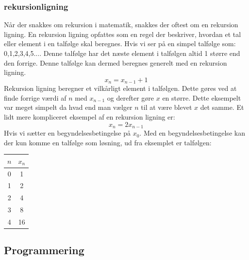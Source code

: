 \documentclass[12pt]{article}
\begin{document}
\subsubsection{rekursionligning}
Når der snakkes om rekursion i matematik, snakkes der oftest om en rekursion ligning. 
En rekursion ligning opfattes som en regel der beskriver, hvordan et tal eller element i en talfølge skal beregnes. Hvis vi ser på en simpel talfølge som: {0,1,2,3,4,5...}. Denne talfølge har det næste element i talfølgen altid 1 større end den forrige. Denne talfølge kan dermed beregnes generelt med en rekursion ligning. 
\[x_n = x_{n-1} + 1\] 
Rekursion ligning beregner et vilkårligt element i talfølgen. Dette gøres ved at finde forrige værdi af $n$ med $x_{n-1}$ og derefter gøre $x$ en større. 
Dette eksempelt var meget simpelt da hvad end man vælger $n$ til at være blevet $x$ det samme. 
Et lidt mere kompliceret eksempel af en rekursion ligning er:
\[x_n = 2x_{n-1}\] 
Hvis vi sætter en begyndelsesbetingelse på $x_{0}$.
Med en begyndelsesbetingelse kan der kun komme en talfølge som løsning, 
ud fra eksemplet er talfølgen:
\begin{table}[ht]
  \centering
  \begin{tabular}{ |c|c| }
   \hline
   \textbf{$n$} & \textbf{$x_{n}$}  \\ 
   \hline
   0 & 1  \\
   \hline
   1 & 2 \\ 
   \hline
   2 & 4 \\ 
   \hline
   3 & 8  \\ 
   \hline
   4 & 16  \\ 
   \hline
  \end{tabular}
\end{table}
\subsection{Programmering}
\end{document}
